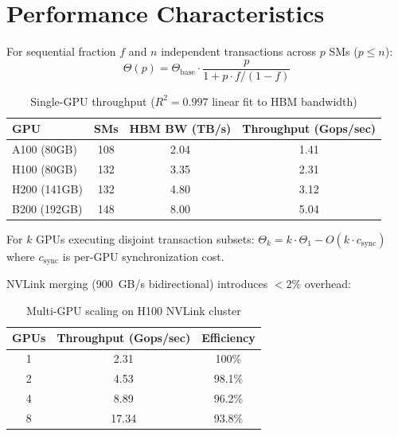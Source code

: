 \section{Performance Characteristics}

\label{sec:performance}

\begin{theorem}
\label{thm:linear}
For sequential fraction $f$ and $n$ independent transactions across $p$ SMs ($p \leq n$):
\begin{equation}
\Theta(p) = \Theta_{\text{base}} \cdot \frac{p}{1 + p \cdot f / (1 - f)}
\end{equation}
\end{theorem}

\begin{table}[h]
\centering
\begin{tabular}{lccc}
\toprule
\textbf{GPU} & \textbf{SMs} & \textbf{HBM BW (TB/s)} & \textbf{Throughput (Gops/sec)} \\
\midrule
A100 (80GB) & 108 & 2.04 & 1.41 \\
H100 (80GB) & 132 & 3.35 & 2.31 \\
H200 (141GB) & 132 & 4.80 & 3.12 \\
B200 (192GB) & 148 & 8.00 & 5.04 \\
\bottomrule
\end{tabular}
\caption{Single-GPU throughput ($R^2 = 0.997$ linear fit to HBM bandwidth)}
\label{tab:gpu-throughput}
\end{table}

\begin{proposition}
For $k$ GPUs executing disjoint transaction subsets:
$\Theta_k = k \cdot \Theta_1 - O(k \cdot c_{\text{sync}})$
where $c_{\text{sync}}$ is per-GPU synchronization cost.
\end{proposition}

NVLink merging (900~GB/s bidirectional) introduces $<$2\% overhead:

\begin{table}[h]
\centering
\begin{tabular}{ccc}
\toprule
\textbf{GPUs} & \textbf{Throughput (Gops/sec)} & \textbf{Efficiency} \\
\midrule
1 & 2.31 & 100\% \\
2 & 4.53 & 98.1\% \\
4 & 8.89 & 96.2\% \\
8 & 17.34 & 93.8\% \\
\bottomrule
\end{tabular}
\caption{Multi-GPU scaling on H100 NVLink cluster}
\label{tab:multigpu}
\end{table}

